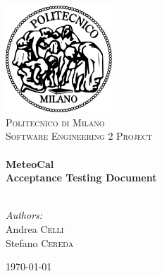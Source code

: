 \begin{titlepage}
\begin{center}

\includegraphics[width=0.30\textwidth]{./images/logo}~\\[1cm]
\textsc{\LARGE Politecnico di Milano}\\[1.5cm]

\textsc{\Large Software Engineering 2 Project}\\[0.5cm]

\HRule \\[0.4cm]
{ \Huge \bfseries MeteoCal \\[0.4cm] }
{ \huge \bfseries Acceptance Testing Document \\[0.4cm] }
\HRule \\[1.5cm]

\begin{flushright}
\noindent
\large
\emph{Authors:}\\
Andrea \textsc{Celli}\\
Stefano \textsc{Cereda}
\end{flushright}
\vfill

{\large \today}

\end{center}
\end{titlepage}